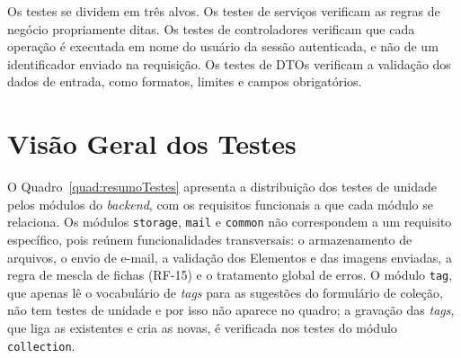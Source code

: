 Os testes se dividem em três alvos. Os testes de serviços verificam as regras de negócio propriamente ditas. Os testes de controladores verificam que cada operação é executada em nome do usuário da sessão autenticada, e não de um identificador enviado na requisição. Os testes de DTOs verificam a validação dos dados de entrada, como formatos, limites e campos obrigatórios.

\section{Visão Geral dos Testes}

O Quadro~\ref{quad:resumoTestes} apresenta a distribuição dos testes de unidade pelos módulos do \textit{backend}, com os requisitos funcionais a que cada módulo se relaciona. Os módulos \texttt{storage}, \texttt{mail} e \texttt{common} não correspondem a um requisito específico, pois reúnem funcionalidades transversais: o armazenamento de arquivos, o envio de e-mail, a validação dos Elementos e das imagens enviadas, a regra de mescla de fichas (RF-15) e o tratamento global de erros. O módulo \texttt{tag}, que apenas lê o vocabulário de \textit{tags} para as sugestões do formulário de coleção, não tem testes de unidade e por isso não aparece no quadro; a gravação das \textit{tags}, que liga as existentes e cria as novas, é verificada nos testes do módulo \texttt{collection}.

